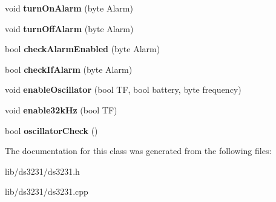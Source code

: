 \begin{DoxyCompactItemize}
\mbox{\label{class_d_s3231_ab20d33975630e18aa5cd90777762fa7d}} 
void {\bfseries turn\+On\+Alarm} (byte Alarm)
\item 
\mbox{\label{class_d_s3231_ae59672ea72585a5aaaa682b2bd4c712c}} 
void {\bfseries turn\+Off\+Alarm} (byte Alarm)
\item 
\mbox{\label{class_d_s3231_a3511f647fbd1402cccceb51ba1702955}} 
bool {\bfseries check\+Alarm\+Enabled} (byte Alarm)
\item 
\mbox{\label{class_d_s3231_a11ffaac269fa7b34325bd7fc6d0806d4}} 
bool {\bfseries check\+If\+Alarm} (byte Alarm)
\item 
\mbox{\label{class_d_s3231_a0bb4f11250fa0d024698a06a3d583086}} 
void {\bfseries enable\+Oscillator} (bool TF, bool battery, byte frequency)
\item 
\mbox{\label{class_d_s3231_ab66e5d46d0ca420ddff8a9f574194a26}} 
void {\bfseries enable32k\+Hz} (bool TF)
\item 
\mbox{\label{class_d_s3231_a8ff66dc431f8a91adc7b5b6745c7a962}} 
bool {\bfseries oscillator\+Check} ()
\end{DoxyCompactItemize}


The documentation for this class was generated from the following files\+:\begin{DoxyCompactItemize}
\item 
lib/ds3231/ds3231.\+h\item 
lib/ds3231/ds3231.\+cpp\end{DoxyCompactItemize}
